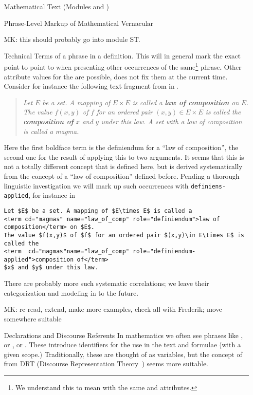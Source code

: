 \begin{tchapter}[id=mtxt,short=Mathematical Text]{Mathematical Text (Modules
  {} and {})}
\begin{tsection}[id=phrases]{Phrase-Level Markup of Mathematical Vernacular}
\begin{oldpart}{MK: this should probably go into module ST.}
\begin{tsubsection}[id=terms]{Technical Terms}
of a phrase in a definition.  This will in general mark the exact point to point to when
presenting other occurrences of the same\footnote{We understand this to mean with the same
  {} and {} attributes.} phrase. Other attribute
values for the {} are possible, {\omdoc} does not fix them at the
current time.  Consider for instance the following text fragment from
{} in {}.

\begin{quote}
  {} {\emph{Let $E$ be a set. A mapping of $E\times E$ is called a {\bf{law
        of composition}} on $E$. The value $f(x,y)$ of $f$ for an ordered pair $(x,y)\in
    E\times E$ is called the {\bf{composition of}} $x$ and $y$ under this law.  A set with
    a law of composition is called a magma.}}
\end{quote}
Here the first boldface term is the definiendum for a ``law of composition'', the second
one for the result of applying this to two arguments. It seems that this is not a totally
different concept that is defined here, but is derived systematically from the concept of
a ``law of composition'' defined before. Pending a thorough linguistic investigation we
will mark up such occurrences with {\tt{definiens-applied}}, for instance in

\begin{lstlisting}[mathescape,caption={Marking up the Technical Terms},label=lst:terms]
Let $E$ be a set. A mapping of $E\times E$ is called a 
<term cd="magmas" name="law_of_comp" role="definiendum">law of composition</term> on $E$. 
The value $f(x,y)$ of $f$ for an ordered pair $(x,y)\in E\times E$ is called the 
<term  cd="magmas"name="law_of_comp" role="definiendum-applied">composition of</term>
$x$ and $y$ under this law.
\end{lstlisting}
There are probably more such systematic correlations; we leave their categorization and
modeling in {\omdoc} to the future.
\end{tsubsection}
\end{oldpart}
\end{tsection}

\begin{newpart}{MK: re-read, extend, make more examples, check all with Frederik; move
    somewhere suitable}
\begin{tsection}[id=declarations]{Declarations and Discourse Referents}
  In mathematics we often see phrases like , or , or . These
  introduce identifiers for the use in the text and formulae (with a given scope.)
  Traditionally, these are thought of as variables, but the concept of  from DRT (Discourse Representation Theory~\cite{KamRey:acffodrs96}) seems
  more suitable. 


\end{tsection}
\end{newpart}
\end{tchapter}
